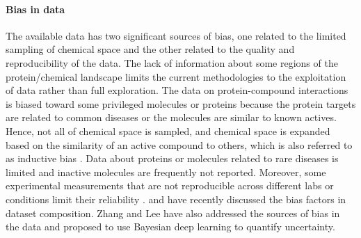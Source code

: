 \documentclass[review]{elsarticle}
\begin{document}
\paragraph{Bias in data} The available data has two significant sources of bias, one related to the limited sampling of chemical space and the other related to the quality and reproducibility of the data. The lack of information about some regions of the protein/chemical landscape limits the current methodologies to the exploitation of data rather than full exploration. The data on  protein-compound interactions is biased toward some privileged molecules or proteins because the protein targets  are related to common diseases or the molecules  are similar to known actives. Hence, not all of chemical space is sampled, and  chemical space is expanded based on the similarity of an active compound to others, which is also referred to as  inductive bias \cite{cleves2008effects}. Data about proteins or molecules related to rare diseases is limited and inactive molecules are frequently not reported.  Moreover, some experimental measurements that are not reproducible across different labs or conditions limit their reliability \cite{pogue2018rare}. \citet{sieg2019need} and \citet{zhang2019bayesian} have recently discussed the bias factors in dataset composition. Zhang and Lee have also addressed the sources of bias in the data and proposed to use Bayesian deep learning to quantify uncertainty.
\end{document}
